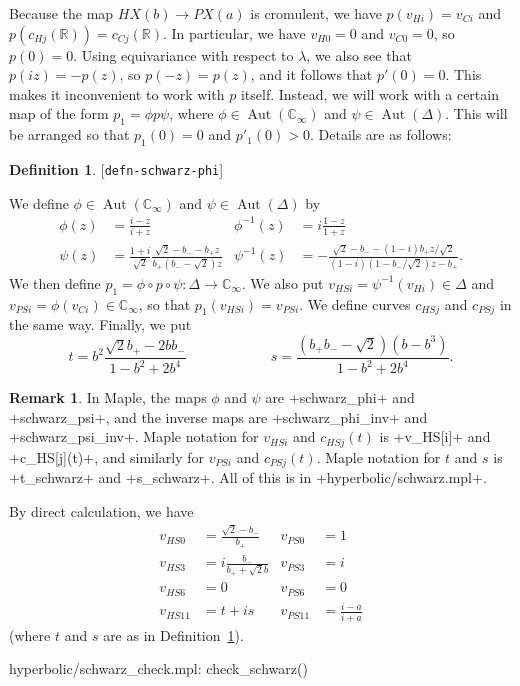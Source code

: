 \documentclass[reqno]{amsart}
\newcommand{\lbl}[1]{\label{#1}\textup{[\texttt{#1}]}\par}
\newcommand{\lbl}{\label}
\newcommand{\Aut}	{\operatorname{Aut}}
\newcommand{\Dl}        {\Delta}
\newcommand{\lm}        {\lambda}
\newcommand{\R}         {{\mathbb{R}}}
\newcommand{\C}         {{\mathbb{C}}}
\newcommand{\rt}        {\sqrt{2}}
\renewcommand{\:}{\colon}
\theoremstyle{definition}
\newtheorem{remark}[theorem]{Remark}
\newtheorem{definition}[theorem]{Definition}
\begin{document}
Because the map $HX(b)\to PX(a)$ is cromulent, we have
$p(v_{Hi})=v_{Ci}$ and $p(c_{Hj}(\R))=c_{Cj}(\R)$.  In particular, we
have $v_{H0}=0$ and $v_{C0}=0$, so $p(0)=0$.  Using equivariance with
respect to $\lm$, we also see that $p(iz)=-p(z)$, so $p(-z)=p(z)$, and
it follows that $p'(0)=0$.  This makes it inconvenient to work with
$p$ itself.  Instead, we will work with a certain map of the form
$p_1=\phi p\psi$, where $\phi\in\Aut(\C_\infty)$ and
$\psi\in\Aut(\Dl)$.  This will be arranged so that $p_1(0)=0$ and
$p'_1(0)>0$.  Details are as follows:
\begin{definition}\lbl{defn-schwarz-phi}
 We define $\phi\in\Aut(\C_\infty)$ and $\psi\in\Aut(\Dl)$ by
 \begin{align*}
  \phi(z) &= \frac{i-z}{i+z} &
  \phi^{-1}(z) &= i \frac{1-z}{1+z} \\
  \psi(z) &= \frac{1+i}{\rt}
    \frac{\rt-b_- - b_+z}{b_+ (b_--\rt)z} &
  \psi^{-1}(z) &= -\frac{\rt-b_--(1-i)b_+z/\rt}{
                          (1-i)(1-b_-/\rt)z-b_+}.
 \end{align*}
 We then define $p_1=\phi\circ p\circ\psi\:\Dl\to\C_\infty$.  We also
 put $v_{HSi}=\psi^{-1}(v_{Hi})\in\Dl$ and
 $v_{PSi}=\phi(v_{Ci})\in\C_\infty$, so that $p_1(v_{HSi})=v_{PSi}$.
 We define curves $c_{HSj}$ and $c_{PSj}$ in the same way.  Finally,
 we put
 \[ t = b^2\frac{\rt b_+ - 2bb_-}{1-b^2+2b^4}
    \hspace{6em}
    s = \frac{(b_+b_--\rt)(b-b^3)}{1-b^2+2b^4}.
 \]
\end{definition}
\begin{remark}
 In Maple, the maps $\phi$ and $\psi$ are \mcode+schwarz_phi+ and
 \mcode+schwarz_psi+, and the inverse maps are \mcode+schwarz_phi_inv+ and
 \mcode+schwarz_psi_inv+.  Maple notation for $v_{HSi}$ and
 $c_{HSj}(t)$ is \mcode+v_HS[i]+ and \mcode+c_HS[j](t)+, and similarly
 for $v_{PSi}$ and $c_{PSj}(t)$.  Maple notation for $t$ and $s$ is
 \mcode+t_schwarz+ and \mcode+s_schwarz+.  All of this is in
 \fname+hyperbolic/schwarz.mpl+.
\end{remark}

By direct calculation, we have
\begin{align*}
 v_{HS0}  &= \frac{\rt-b_-}{b_+} &
 v_{PS0}  &= 1 \\
 v_{HS3}  &= i \frac{b_-}{b_++\rt b} &
 v_{PS3}  &= i \\
 v_{HS6}  &= 0 &
 v_{PS6}  &= 0 \\
 v_{HS11} &= t+is &
 v_{PS11} &= \frac{i-a}{i+a}
\end{align*}
(where $t$ and $s$ are as in Definition~\ref{defn-schwarz-phi}).
\begin{checks}
 hyperbolic/schwarz_check.mpl: check_schwarz()
\end{checks}
\end{document}
